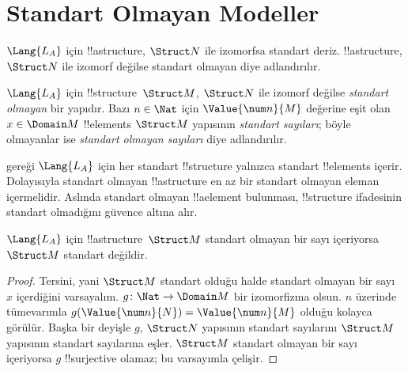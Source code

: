 

\section{Standart Olmayan Modeller}

\begin{explain}
$\Lang{L_A}$ için !!a{structure}, $\Struct N$ ile izomorfsa standart
deriz. !!a{structure}, $\Struct N$ ile izomorf değilse standart olmayan
diye adlandırılır.
\end{explain}

\begin{defn}
$\Lang{L_A}$ için !!{structure}~$\Struct M$, $\Struct N$ ile izomorf
değilse \emph{standart olmayan} bir yapıdır. Bazı $n\in\Nat$ için
$\Value{\num n}{M}$ değerine eşit olan $x\in\Domain M$ !!{element}s
$\Struct M$ yapısının \emph{standart sayıları}; böyle olmayanlar ise
\emph{standart olmayan sayıları} diye adlandırılır.
\end{defn}

\begin{explain}
 gereği $\Lang{L_A}$ için her standart
!!{structure} yalnızca standart !!{element}s içerir. Dolayısıyla
standart olmayan !!a{structure} en az bir standart olmayan eleman
içermelidir. Aslında standart olmayan !!a{element} bulunması,
!!{structure} ifadesinin standart olmadığını güvence altına alır.
\end{explain}

\begin{prop}
$\Lang{L_A}$ için !!a{structure}~$\Struct M$ standart olmayan bir sayı
içeriyorsa $\Struct M$ standart değildir.
\end{prop}

\begin{proof}
Tersini, yani $\Struct M$ standart olduğu halde standart olmayan bir
sayı~$x$ içerdiğini varsayalım. $g\colon\Nat\to\Domain M$ bir
izomorfizma olsun. $n$ üzerinde tümevarımla
$g(\Value{\num n}{N})=\Value{\num n}{M}$ olduğu kolayca görülür.
Başka bir deyişle $g$, $\Struct N$ yapısının standart sayılarını
$\Struct M$ yapısının standart sayılarına eşler. $\Struct M$ standart
olmayan bir sayı içeriyorsa $g$ !!{surjective} olamaz; bu varsayımla
çelişir.
\end{proof}

